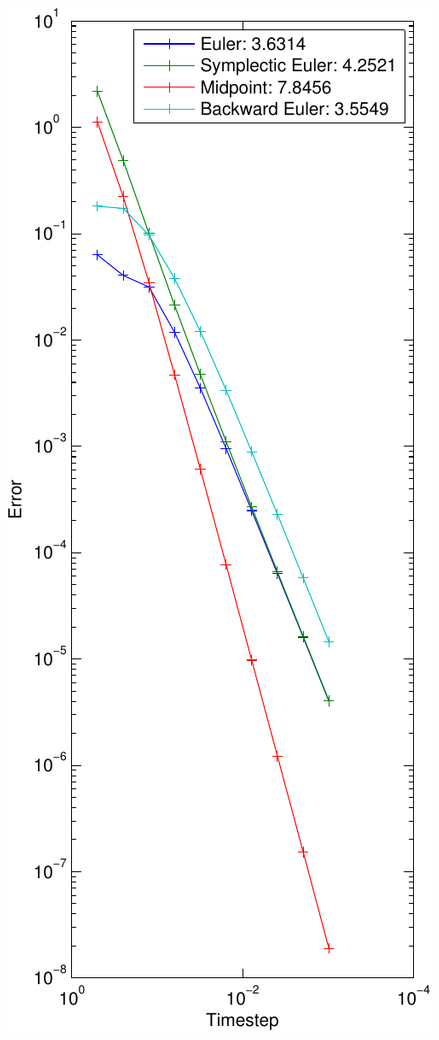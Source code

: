 \begin{figure}[]
	\begin{center}
		\includegraphics*[width=\textwidth]{graphics/ErrorCvgDamp1-crop.pdf}
	\end{center}
	\caption{}
	\label{fig:}
\end{figure}

